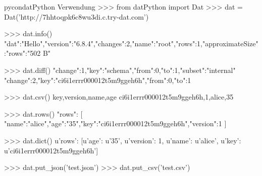\begin{srclst}{pycon}{datPython Verwendung}
>>> from datPython import Dat
>>> dat = Dat('http://7hhtoqpk6c8wu3di.c.try-dat.com')

>>> dat.info()
{"dat":"Hello","version":"6.8.4","changes":2,"name":"root","rows":1,"approximateSize":{"rows":"502 B"}}

>>> dat.diff()
{"change":1,"key":"schema","from":0,"to":1,"subset":"internal"}
{"change":2,"key":"ci6i1errr000012t5m9ggeh6h","from":0,"to":1}

>>> dat.csv()
key,version,name,age
ci6i1errr000012t5m9ggeh6h,1,alice,35

>>> dat.rows()
{"rows": [
	{"name":"alice","age":"35","key":"ci6i1errr000012t5m9ggeh6h","version":1}
	]}

>>> dat.dict()
{u'rows': [{u'age': u'35', u'version': 1, u'name': u'alice', u'key': u'ci6i1errr000012t5m9ggeh6h'}]}

>>> dat.put_json('test.json')
>>> dat.put_csv('test.csv')
\end{srclst}

